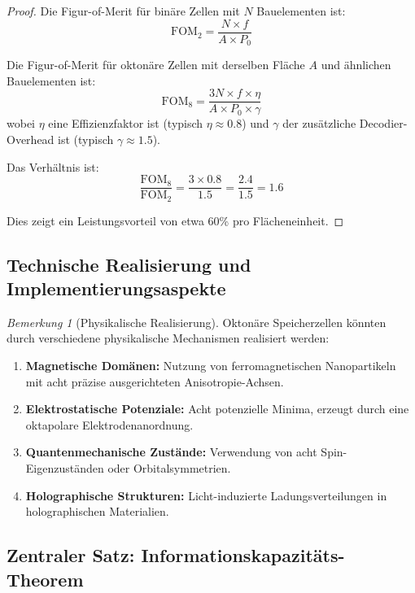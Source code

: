 \documentclass[12pt, a4paper]{article}
\theoremstyle{definition}
\theoremstyle{remark}
\newtheorem{remark}[theorem]{Bemerkung}
\begin{document}
\begin{proof}
Die Figur-of-Merit für binäre Zellen mit $N$ Bauelementen ist:
\[
\text{FOM}_2 = \frac{N \times f}{A \times P_0}
\]

Die Figur-of-Merit für oktonäre Zellen mit derselben Fläche $A$ und ähnlichen Bauelementen ist:
\[
\text{FOM}_8 = \frac{3N \times f \times \eta}{A \times P_0 \times \gamma}
\]
wobei $\eta$ eine Effizienzfaktor ist (typisch $\eta \approx 0.8$) und $\gamma$ der zusätzliche Decodier-Overhead ist (typisch $\gamma \approx 1.5$).

Das Verhältnis ist:
\[
\frac{\text{FOM}_8}{\text{FOM}_2} = \frac{3 \times 0.8}{1.5} = \frac{2.4}{1.5} = 1.6
\]

Dies zeigt ein Leistungsvorteil von etwa 60\% pro Flächeneinheit.
\end{proof}

\subsection{Technische Realisierung und Implementierungsaspekte}
\label{subsec:technische_realisierung}

\begin{remark}[Physikalische Realisierung]
Oktonäre Speicherzellen könnten durch verschiedene physikalische Mechanismen realisiert werden:
\begin{enumerate}[label=(\roman*)]
  \item \textbf{Magnetische Domänen:} Nutzung von ferromagnetischen Nanopartikeln mit acht präzise ausgerichteten Anisotropie-Achsen.
  \item \textbf{Elektrostatische Potenziale:} Acht potenzielle Minima, erzeugt durch eine oktapolare Elektrodenanordnung.
  \item \textbf{Quantenmechanische Zustände:} Verwendung von acht Spin-Eigenzuständen oder Orbitalsymmetrien.
  \item \textbf{Holographische Strukturen:} Licht-induzierte Ladungsverteilungen in holographischen Materialien.
\end{enumerate}
\end{remark}

\subsection{Zentraler Satz: Informationskapazitäts-Theorem}
\label{subsec:hauptsatz_oktonaer}
\end{document}
